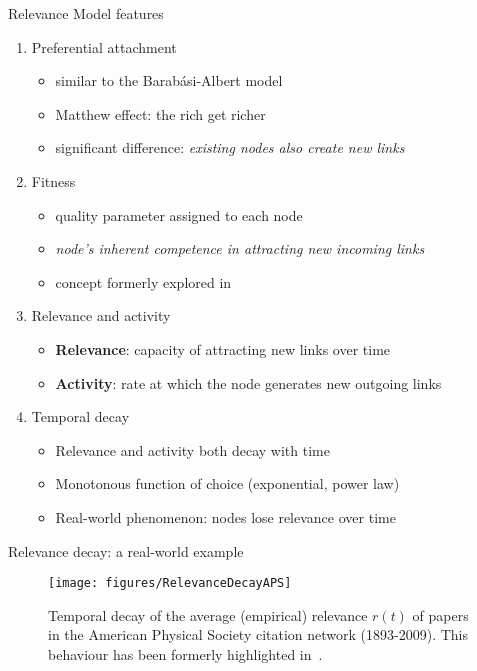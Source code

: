 \begin{frame}{Relevance Model features}
    \begin{enumerate}
        \item \alert{Preferential attachment}
        \begin{itemize}
            \item similar to the Barabási-Albert model
            \item Matthew effect: the rich get richer
            \item significant difference: \emph{existing nodes also create new links}
        \end{itemize}

        \item \alert{Fitness}
        \begin{itemize}
            \item quality parameter assigned to each node
            \item \emph{node’s inherent competence in attracting new incoming links}
            \item concept formerly explored in~\cite{Bianconi2001}
        \end{itemize}

        \item \alert{Relevance and activity}
        \begin{itemize}
            \item \textbf{Relevance}: capacity of attracting new links over time
            \item \textbf{Activity}: rate at which the node generates new outgoing links
        \end{itemize}

        \item \alert{Temporal decay}
        \begin{itemize}
            \item Relevance and activity both decay with time
            \item Monotonous function of choice (exponential, power law)
            \item Real-world phenomenon: nodes lose relevance over time
        \end{itemize}
    \end{enumerate}
\end{frame}

\begin{frame}{Relevance decay: a real-world example}
    \begin{figure}
        \texttt{[image: figures/RelevanceDecayAPS]}
        \caption{Temporal decay of the average (empirical) relevance $r(t)$ of papers in the American Physical Society citation network (1893-2009).
        This behaviour has been formerly highlighted in~\cite{Medo2011}.}
    \end{figure}
\end{frame}

